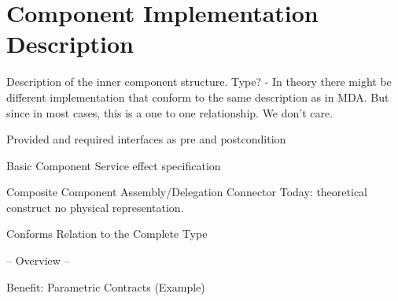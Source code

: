 \section{Component Implementation Description}
\label{sec:ComponentImplementation}

Description of the inner component structure. Type? -  In theory there might be different implementation that conform to the same description as in MDA. But since in most cases, this is a one to one relationship. We don't care.

Provided and required interfaces as pre and postcondition

Basic Component
Service effect specification

Composite Component
Assembly/Delegation Connector 
Today: theoretical construct no physical representation.

Conforms Relation to the Complete Type

-- Overview --

Benefit: Parametric Contracts (Example)
